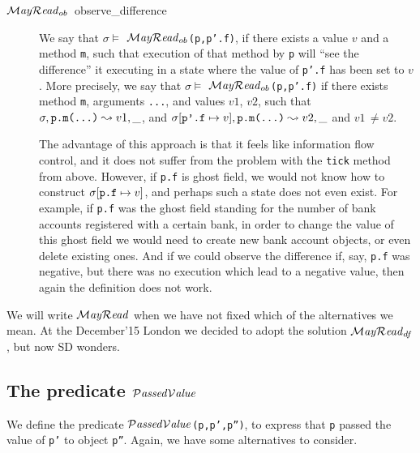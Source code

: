\documentclass{llncs}
\newcommand{\prg}[1]{{\mbox{\tt{#1}}}}
\begin{document}
\begin{description}
\item[$\mathcal{M}\textrm{\textit{ay}}{\mathcal{R}}\textrm{\textit{ead}}_{ob}$\ observe\_difference] 
We say that $\sigma \models$ \prg{$\mathcal{M}\textrm{\textit{ay}}{\mathcal{R}}\textrm{\textit{ead}}_{ob}$(p,p'.f)}, if  there exists a 
value $v$ and a method \prg{m}, such that execution of that method by 
\prg{p} will ``see the difference'' it executing in a state where the value 
of \prg{p'.f}  has been set to $v$. More precisely,  we say that $\sigma \models$ \prg{$\mathcal{M}\textrm{\textit{ay}}{\mathcal{R}}\textrm{\textit{ead}}_{ob}$(p,p'.f)} if  
there exists  method \prg{m}, arguments \prg{...}, and values $v1$, $v2$,  such that $\sigma, \prg{p.m(...)} \leadsto v1, \_$, and 
$\sigma[\prg{p'.f}\mapsto v], \prg{p.m(...)} \leadsto v2, \_$ and $v1\,\neq v2$.

The advantage of this approach is that it feels like information flow control, and it does not suffer from the problem with the \prg{tick} method from above. However, if \prg{p.f} is ghost field, we would not know how to construct $\sigma[\prg{p.f}\mapsto v]$, and perhaps such a state does not even exist. For example, if \prg{p.f} was the ghost field standing for the number of bank accounts registered with a certain bank, in order to change the value of this ghost field we would need to create new bank account objects, or even delete existing ones. And if we could observe the difference if, say, \prg{p.f} was negative, but there was no execution which lead to a negative value, then again the definition does not work.
 \end{description}

\noindent
We will write $\mathcal{M}\textrm{\textit{ay}}{\mathcal{R}}\textrm{\textit{ead}}$ when we have not fixed which of the alternatives we mean. At the December'15 London we decided to adopt the solution $\mathcal{M}\textrm{\textit{ay}}{\mathcal{R}}\textrm{\textit{ead}}_{df}$,  but now SD wonders.

\subsection{The predicate $\mathcal{P}\textrm{\textit{assed}}{\mathcal{V}}\textrm{\textit{alue}}$}

We define the predicate \prg{$\mathcal{P}\textrm{\textit{assed}}{\mathcal{V}}\textrm{\textit{alue}}$(p,p',p'')}, to express that \prg{p} 
passed the value of \prg{p'} to object \prg{p''}.  
Again, we have some alternatives to consider.
\end{document}
